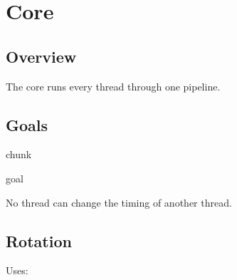 \documentclass[letterpaper,10pt,english]{sphinxmanual}
\begin{document}
\chapter{Core}
\label{\detokenize{core/core:core}}\label{\detokenize{core/core::doc}}

\section{Overview}
\label{\detokenize{core/core:overview}}
\sphinxAtStartPar
The core runs every thread through one pipeline.


\section{Goals}
\label{\detokenize{core/core:goals}}
\begin{sphinxuseclass}{chunk}
\begin{sphinxuseclass}{goal}\label{\detokenize{core/core:core.timing}}
\sphinxAtStartPar
{} 

\sphinxAtStartPar
No thread can change the timing of another thread.

\end{sphinxuseclass}
\end{sphinxuseclass}

\section{Rotation}
\label{\detokenize{core/core:rotation}}
\sphinxAtStartPar
Uses: {\hyperref[\detokenize{design/design:design.timing}]{}}
\end{document}
